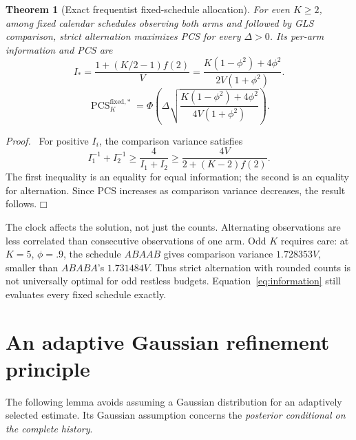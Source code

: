 \documentclass[11pt]{article}
\newtheorem{theorem}{Theorem}
\newenvironment{proof}{\par\noindent\textit{Proof.}\ }{\hfill$\mdlgwhtsquare$\par\medskip}
\newcommand{\PCS}{\operatorname{PCS}}
\begin{document}
\begin{theorem}[Exact frequentist fixed-schedule allocation]
For even $K\geq2$, among fixed calendar schedules observing both arms and followed by GLS comparison, strict alternation maximizes PCS for every $\Delta>0$. Its per-arm information and PCS are
\begin{equation}
I_*=\frac{1+(K/2-1)f(2)}V
=\frac{K(1-\phi^2)+4\phi^2}{2V(1+\phi^2)}.\label{eq:Istar}
\end{equation}
\begin{equation}
\boxed{\PCS_K^{\mathrm{fixed},*}
=\Phi\left(\Delta\sqrt{
\frac{K(1-\phi^2)+4\phi^2}{4V(1+\phi^2)}}\right).}
\label{eq:pcs-fixed}
\end{equation}
\end{theorem}
\begin{proof}
For positive $I_i$, the comparison variance satisfies
\[
I_1^{-1}+I_2^{-1}\geq\frac4{I_1+I_2}
\geq\frac{4V}{2+(K-2)f(2)}.
\]
The first inequality is an equality for equal information; the second is an equality for alternation. Since PCS increases as comparison variance decreases, the result follows.
\end{proof}

The clock affects the solution, not just the counts. Alternating observations are less correlated than consecutive observations of one arm. Odd $K$ requires care: at $K=5$, $\phi=.9$, the schedule $ABAAB$ gives comparison variance $1.728353V$, smaller than $ABABA$'s $1.731484V$. Thus strict alternation with rounded counts is not universally optimal for odd restless budgets. Equation~\eqref{eq:information} still evaluates every fixed schedule exactly.

\section{An adaptive Gaussian refinement principle}
The following lemma avoids assuming a Gaussian distribution for an adaptively selected estimate. Its Gaussian assumption concerns the \emph{posterior conditional on the complete history}.
\end{document}
